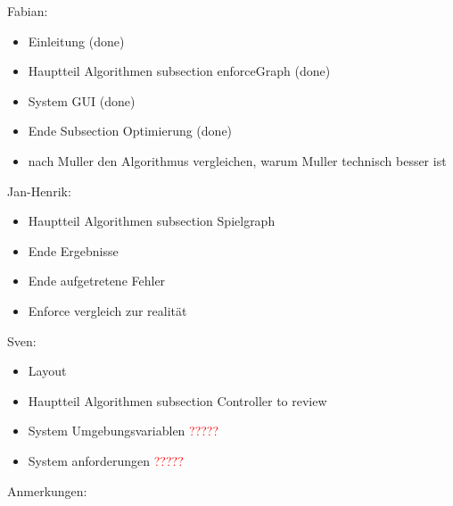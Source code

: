 Fabian:
\begin{itemize}
	\item Einleitung (done)
	\item Hauptteil Algorithmen subsection enforceGraph (done)
	\item System GUI (done)
	\item Ende Subsection Optimierung (done)
	\item nach Muller den Algorithmus vergleichen, warum Muller technisch besser ist
\end{itemize}
Jan-Henrik:
\begin{itemize}
	\item Hauptteil Algorithmen subsection Spielgraph
	\item Ende Ergebnisse
	\item Ende aufgetretene Fehler
	\item Enforce vergleich zur realität
\end{itemize}
Sven:
\begin{itemize}
	\item Layout
	\item Hauptteil Algorithmen subsection Controller to review
	\item System Umgebungsvariablen \textcolor{red}{?????}
	\item System anforderungen \textcolor{red}{?????}
\end{itemize}



Anmerkungen:


